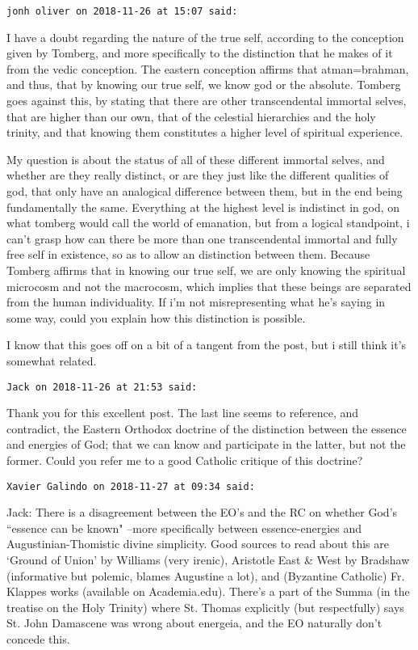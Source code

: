 \begin{footnotesize}\begin{sffamily}



\texttt{jonh oliver on 2018-11-26 at 15:07 said: }

I have a doubt regarding the nature of the true self, according to the conception given by Tomberg, and more specifically to the distinction that he makes of it from the vedic conception. The eastern conception affirms that atman=brahman, and thus, that by knowing our true self, we know god or the absolute. Tomberg goes against this, by stating that there are other transcendental immortal selves, that are higher than our own, that of the celestial hierarchies and the holy trinity, and that knowing them constitutes a higher level of spiritual experience.

My question is about the status of all of these different immortal selves, and whether are they really distinct, or are they just like the different qualities of god, that only have an analogical difference between them, but in the end being fundamentally the same. Everything at the highest level is indistinct in god, on what tomberg would call the world of emanation, but from a logical standpoint, i can't grasp how can there be more than one transcendental immortal and fully free self in existence, so as to allow an distinction between them. Because Tomberg affirms that in knowing our true self, we are only knowing the spiritual microcosm and not the macrocosm, which implies that these beings are separated from the human individuality. If i'm not misrepresenting what he's saying in some way, could you explain how this distinction is possible.

I know that this goes off on a bit of a tangent from the post, but i still think it's somewhat related.


\hfill

\texttt{Jack on 2018-11-26 at 21:53 said: }

Thank you for this excellent post. The last line seems to reference, and contradict, the Eastern Orthodox doctrine of the distinction between the essence and energies of God; that we can know and participate in the latter, but not the former. Could you refer me to a good Catholic critique of this doctrine?


\hfill

\texttt{Xavier Galindo on 2018-11-27 at 09:34 said: }

Jack: There is a disagreement between the EO's and the RC on whether God's ``essence can be known" –more specifically between essence-energies and Augustinian-Thomistic divine simplicity. Good sources to read about this are `Ground of Union' by Williams (very irenic), Aristotle East \& West by Bradshaw (informative but polemic, blames Augustine a lot), and (Byzantine Catholic) Fr. Klappes works (available on Academia.edu). There's a part of the Summa (in the treatise on the Holy Trinity) where St. Thomas explicitly (but respectfully) says St. John Damascene was wrong about energeia, and the EO naturally don't concede this.


\end{sffamily}
\end{footnotesize}

